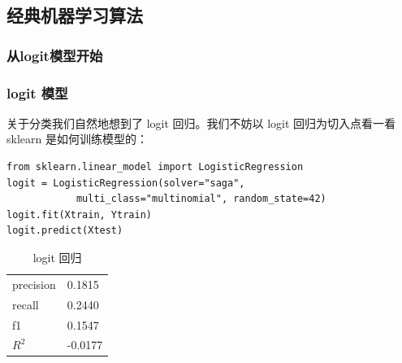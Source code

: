 \documentclass[mathserif,envcountsect,fontset=mac]{ctexbeamer}
\begin{document}
\subsection{经典机器学习算法}
\subsubsection{从logit模型开始}
\begin{frame}[fragile]
    \frametitle{logit 模型}
    关于分类我们自然地想到了 logit 回归。我们不妨以 logit 回归为切入点看一看 sklearn 是如何训练模型的：

    \begin{verbatim}
from sklearn.linear_model import LogisticRegression
logit = LogisticRegression(solver="saga", 
            multi_class="multinomial", random_state=42)
logit.fit(Xtrain, Ytrain)
logit.predict(Xtest)
    \end{verbatim}

    \begin{table}
        \caption{logit 回归}
        \begin{tabular}{ll}
            precision & 0.1815  \\
            recall    & 0.2440  \\
            f1        & 0.1547  \\
            \(R^2\)   & -0.0177 \\
        \end{tabular}
        \label{logit}
    \end{table}
\end{frame}
\end{document}
